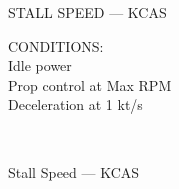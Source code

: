 \begin{figure}[t]
\begin{center}
\begin{perfhdr}STALL SPEED --- KCAS\\
\end{perfhdr}

\begin{minipage}{2in}
  \begin{flushleft}
    CONDITIONS:\\
    Idle power\\
    Prop control at Max RPM\\
    Deceleration at 1 kt/s\\
    \end{flushleft}
  \end{minipage}\\
\end{center}  %
\caption{Stall Speed --- KCAS}
\label{stall-speed-kcas}
\end{figure}
\clearpage


